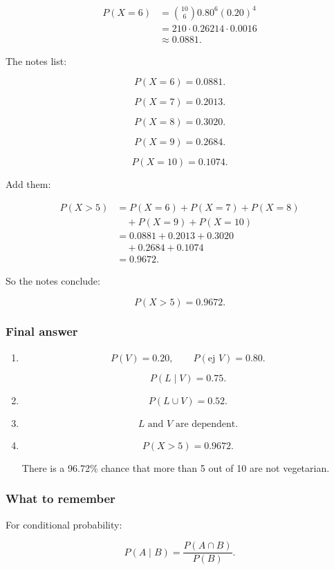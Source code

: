 \documentclass[10pt]{article}
\begin{document}
\begin{align*}
P(X=6)
&=
\binom{10}{6}
0.80^6(0.20)^4 \\[2mm]
&=210\cdot 0.26214\cdot 0.0016 \\[2mm]
&\approx 0.0881.
\end{align*}

The notes list:

\[
P(X=6)=0.0881.
\]

\[
P(X=7)=0.2013.
\]

\[
P(X=8)=0.3020.
\]

\[
P(X=9)=0.2684.
\]

\[
P(X=10)=0.1074.
\]

Add them:

\begin{align*}
P(X>5)
&=P(X=6)+P(X=7)+P(X=8) \\
&\quad +P(X=9)+P(X=10) \\[2mm]
&=0.0881+0.2013+0.3020 \\
&\quad +0.2684+0.1074 \\[2mm]
&=0.9672.
\end{align*}

So the notes conclude:

\[
P(X>5)=0.9672.
\]

\subsubsection*{Final answer}
\begin{enumerate}[label=\alph*)]
\item
\[
P(V)=0.20,
\qquad
P(\text{ej }V)=0.80.
\]

\[
P(L\mid V)=0.75.
\]

\item
\[
P(L\cup V)=0.52.
\]

\item
\[
L \text{ and } V
\text{ are dependent.}
\]

\item
\[
P(X>5)=0.9672.
\]

There is a 96.72\% chance that more than 5 out of
10 are not vegetarian.
\end{enumerate}

\subsubsection*{What to remember}
For conditional probability:

\[
P(A\mid B)
=
\frac{P(A\cap B)}{P(B)}.
\]
\end{document}
